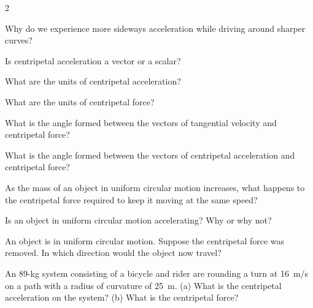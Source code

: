 \documentclass[dvipsnames]{article}
\numberwithin{equation}{section}
\numberwithin{figure}{section}
\begin{document}
\begin{multicols}{2}
\begin{exercise} \label{KB7t4k}
    Why do we experience more sideways acceleration while driving around sharper curves?
\end{exercise}

\begin{exercise} \label{jb3iGO}
    Is centripetal acceleration a vector or a scalar?
\end{exercise}

\begin{exercise} \label{TUxTQh}
    What are the units of centripetal acceleration?
\end{exercise}

\begin{exercise} \label{9YKhPo}
    What are the units of centripetal force?
\end{exercise}

\begin{exercise} \label{wS6Htw}
    What is the angle formed between the vectors of tangential velocity and centripetal force?
\end{exercise}

\begin{exercise} \label{barV9C}
    What is the angle formed between the vectors of centripetal acceleration and centripetal force?
\end{exercise}


\begin{exercise} \label{M6NkHB}
    As the mass of an object in uniform circular motion increases, what happens to the centripetal force required to keep it moving at the same speed?
\end{exercise}

\begin{exercise} \label{IAjJBC}
    Is an object in uniform circular motion accelerating? Why or why not?
\end{exercise}

\begin{exercise} \label{G8I4Up}
    An object is in uniform circular motion. Suppose the centripetal force was removed. In which direction would the object now travel?
\end{exercise}

\begin{exercise} \label{Kv8Old}
An 89-kg system consisting of a bicycle and rider are rounding a turn at \SI{16}{m/s} on a path with a radius of curvature of \SI{25}{m}. (a) What is the centripetal acceleration on the system? (b) What is the centripetal force?
\end{exercise}


\end{multicols}
\end{document}
